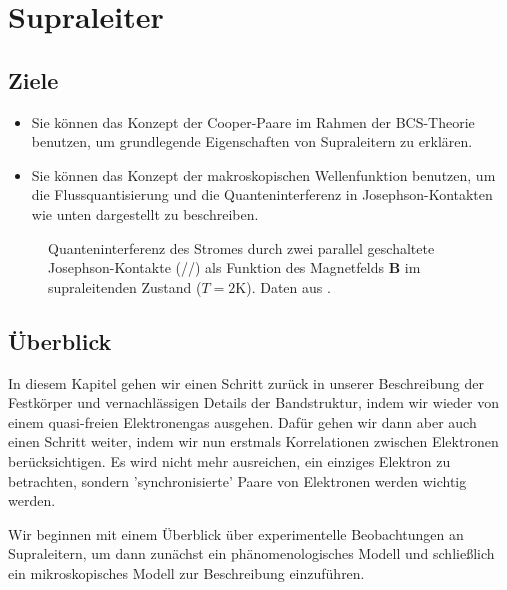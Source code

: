 \renewcommand{\chapterauthors}{Markus Lippitz}
\renewcommand{\lastmod}{12. Juni 2025}

\chapter{Supraleiter}




\section{Ziele}
 


\begin{itemize}
\item Sie können das Konzept der Cooper-Paare im Rahmen der BCS-Theorie benutzen, um grundlegende Eigenschaften von Supraleitern zu erklären.
\item Sie können das Konzept der makroskopischen Wellenfunktion benutzen, um die Flussquantisierung und die Quanteninterferenz in Josephson-Kontakten wie unten dargestellt zu beschreiben.
\end{itemize}

\begin{figure}
    \caption{Quanteninterferenz des Stromes durch zwei parallel geschaltete Josephson-Kontakte (//) als Funktion des Magnetfelds $\bm{B}$ im supraleitenden Zustand ($T=2$K). Daten aus \cite{Jaklevic1965}. \label{fig:6_squid_data}
}
\end{figure}




\section{Überblick}

In diesem Kapitel gehen wir einen Schritt zurück in unserer Beschreibung der Festkörper und vernachlässigen Details der Bandstruktur, indem wir wieder von einem quasi-freien Elektronengas ausgehen. Dafür gehen wir dann aber auch einen Schritt weiter, indem wir nun erstmals Korrelationen zwischen Elektronen berücksichtigen. Es wird nicht mehr ausreichen, ein einziges Elektron zu betrachten, sondern 'synchronisierte' Paare von Elektronen werden wichtig werden.

Wir beginnen mit einem Überblick über experimentelle Beobachtungen an Supraleitern, um dann zunächst ein phänomenologisches  Modell und schließlich ein mikroskopisches Modell zur Beschreibung einzuführen.

